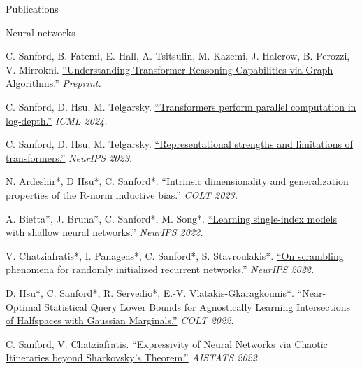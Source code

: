 \documentclass{resume} %
\begin{document}
\newpage
\begin{rSection}{Publications}
\begin{rSubsection}{Neural networks}{}{}{}{}
\item C. Sanford, B. Fatemi, E. Hall, A. Tsitsulin, M. Kazemi, J. Halcrow, B. Perozzi, V. Mirrokni. \href{https://arxiv.org/abs/2405.18512}{``Understanding Transformer Reasoning Capabilities via Graph Algorithms.''} \textit{Preprint.}

\item C. Sanford, D. Hsu, M. Telgarsky. \href{https://arxiv.org/abs/2402.09268}{``Transformers perform parallel computation in log-depth.''} \textit{ICML 2024.}

\item C. Sanford, D. Hsu, M. Telgarsky. \href{https://arxiv.org/abs/2306.02896}{``Representational strengths and limitations of transformers.''} \textit{NeurIPS 2023.}

\item N. Ardeshir*, D Hsu*, C. Sanford*. \href{https://proceedings.mlr.press/v195/ardeshir23a.html}{``Intrinsic dimensionality and generalization properties of the R-norm inductive bias.''} \textit{COLT 2023.}

\item A. Bietta*, J. Bruna*, C. Sanford*, M. Song*. \href{https://proceedings.neurips.cc/paper_files/paper/2022/hash/3fb6c52aeb11e09053c16eabee74dd7b-Abstract-Conference.html}{``Learning single-index models with shallow neural networks.''} \textit{NeurIPS 2022.}

\item V. Chatziafratis*, I. Panageas*, C. Sanford*, S. Stavroulakis*. \href{https://proceedings.neurips.cc/paper_files/paper/2022/hash/755acd0c7c07180d78959b6d89768207-Abstract-Conference.html}{``On scrambling phenomena for randomly initialized recurrent networks.''} \textit{NeurIPS 2022.}

\item D. Hsu*, C. Sanford*, R. Servedio*, E.-V. Vlatakis-Gkaragkounis*. \href{https://proceedings.mlr.press/v178/hsu22a.html}{``Near-Optimal Statistical Query Lower Bounds for Agnostically Learning Intersections of Halfspaces with Gaussian Marginals.''} \textit{COLT 2022.}

\item C. Sanford, V. Chatziafratis. \href{https://proceedings.mlr.press/v151/sanford22a.html}{``Expressivity of Neural Networks via Chaotic Itineraries beyond Sharkovsky's Theorem.''} \textit{AISTATS 2022.}


\end{rSubsection}
\end{rSection}
\end{document}
